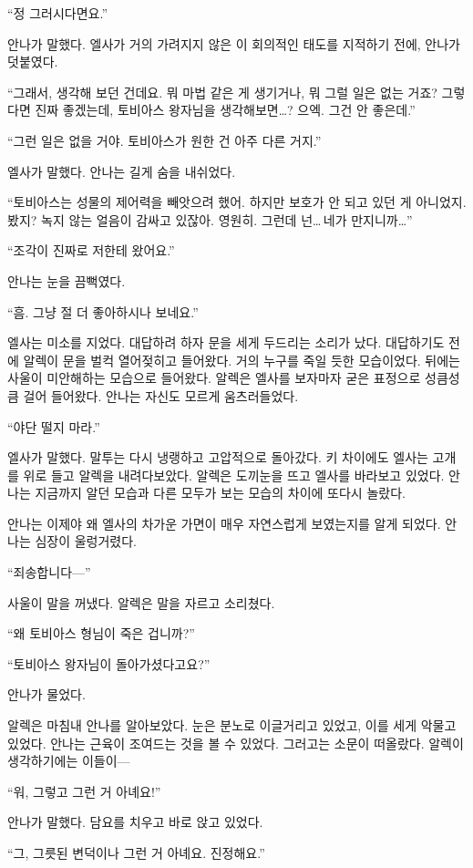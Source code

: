 ``정 그러시다면요.''

안나가 말했다. 엘사가 거의 가려지지 않은 이 회의적인 태도를 지적하기 전에, 안나가 덧붙였다.

``그래서, 생각해 보던 건데요. 뭐 마법 같은 게 생기거나, 뭐 그럴 일은 없는 거죠? 그렇다면 진짜 좋겠는데, 토비아스 왕자님을 생각해보면\ldots? 으엑. 그건 안 좋은데.''

``그런 일은 없을 거야. 토비아스가 원한 건 아주 다른 거지.''

엘사가 말했다. 안나는 길게 숨을 내쉬었다.

``토비아스는 성물의 제어력을 빼앗으려 했어. 하지만 보호가 안 되고 있던 게 아니었지. 봤지? 녹지 않는 얼음이 감싸고 있잖아. 영원히. 그런데 넌\ldots\,네가 만지니까\ldots''

``조각이 진짜로 저한테 왔어요.''

안나는 눈을 끔뻑였다.

``흠. 그냥 절 더 좋아하시나 보네요.''

엘사는 미소를 지었다. 대답하려 하자 문을 세게 두드리는 소리가 났다. 대답하기도 전에 알렉이 문을 벌컥 열어젖히고 들어왔다. 거의 누구를 죽일 듯한 모습이었다. 뒤에는 사울이 미안해하는 모습으로 들어왔다. 알렉은 엘사를 보자마자 굳은 표정으로 성큼성큼 걸어 들어왔다. 안나는 자신도 모르게 움츠러들었다.

``야단 떨지 마라.''

엘사가 말했다. 말투는 다시 냉랭하고 고압적으로 돌아갔다. 키 차이에도 엘사는 고개를 위로 들고 알렉을 내려다보았다. 알렉은 도끼눈을 뜨고 엘사를 바라보고 있었다. 안나는 지금까지 알던 모습과 다른 모두가 보는 모습의 차이에 또다시 놀랐다.

안나는 이제야 왜 엘사의 차가운 가면이 매우 자연스럽게 보였는지를 알게 되었다. 안나는 심장이 울렁거렸다.

``죄송합니다—''

사울이 말을 꺼냈다. 알렉은 말을 자르고 소리쳤다.

``왜 토비아스 형님이 죽은 겁니까?''

``토비아스 왕자님이 돌아가셨다고요?''

안나가 물었다.

알렉은 마침내 안나를 알아보았다. 눈은 분노로 이글거리고 있었고, 이를 세게 악물고 있었다. 안나는 근육이 조여드는 것을 볼 수 있었다. 그러고는 소문이 떠올랐다. 알렉이 생각하기에는 이들이—

``워, 그렇고 그런 거 아녜요!''

안나가 말했다. 담요를 치우고 바로 앉고 있었다.

``그, 그릇된 변덕이나 그런 거 아녜요. 진정해요.''

